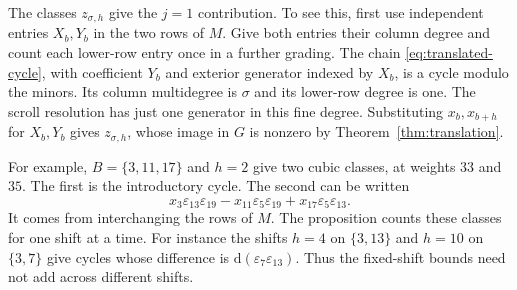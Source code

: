 The classes $z_{\sigma,h}$ give the $j=1$ contribution. To see this,
first use independent entries $X_b,Y_b$ in the two rows of $M$.
Give both entries their column degree and count each lower-row entry
once in a further grading. The chain \eqref{eq:translated-cycle}, with
coefficient $Y_b$ and exterior generator indexed by $X_b$, is a cycle
modulo the minors. Its column multidegree is $\sigma$ and its lower-row
degree is one. The scroll resolution has just one generator in this
fine degree. Substituting $x_b,x_{b+h}$ for $X_b,Y_b$ gives
$z_{\sigma,h}$, whose image in $G$ is nonzero by
Theorem~\ref{thm:translation}.

For example, $B=\{3,11,17\}$ and $h=2$ give two cubic classes, at
weights $33$ and $35$. The first is the introductory cycle. The second
can be written
\[
 x_3\varepsilon_{13}\varepsilon_{19}
 -x_{11}\varepsilon_5\varepsilon_{19}
 +x_{17}\varepsilon_5\varepsilon_{13}.
\]
It comes from interchanging the rows of $M$. The proposition counts
these classes for one shift at a time. For instance the shifts
$h=4$ on $\{3,13\}$ and $h=10$ on $\{3,7\}$ give cycles whose
difference is $\mathrm{d}(\varepsilon_7\varepsilon_{13})$.
Thus the fixed-shift bounds need not add across different shifts.
